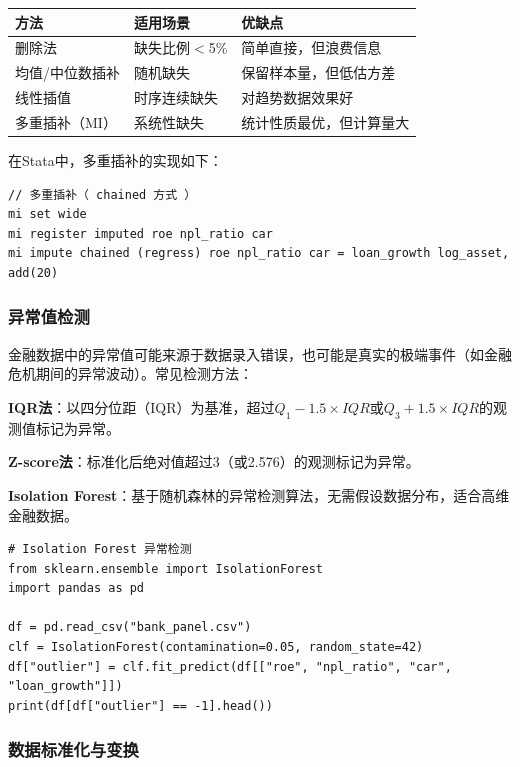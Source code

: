 \begin{table}[H]
\centering
\begin{tabular}{lp{4cm}p{5cm}}
\toprule
\textbf{方法} & \textbf{适用场景} & \textbf{优缺点} \\
\midrule
删除法 & 缺失比例$<$5\% & 简单直接，但浪费信息 \\
均值/中位数插补 & 随机缺失 & 保留样本量，但低估方差 \\
线性插值 & 时序连续缺失 & 对趋势数据效果好 \\
多重插补（MI） & 系统性缺失 & 统计性质最优，但计算量大 \\
\bottomrule
\end{tabular}
\end{table}

在Stata中，多重插补的实现如下：

\begin{lstlisting}[style=stata]
// 多重插补（ chained 方式 ）
mi set wide
mi register imputed roe npl_ratio car
mi impute chained (regress) roe npl_ratio car = loan_growth log_asset, add(20)
\end{lstlisting}

\subsubsection{异常值检测}

金融数据中的异常值可能来源于数据录入错误，也可能是真实的极端事件（如金融危机期间的异常波动）。常见检测方法：

\textbf{IQR法}：以四分位距（IQR）为基准，超过$Q_1 - 1.5 \times IQR$或$Q_3 + 1.5 \times IQR$的观测值标记为异常。

\textbf{Z-score法}：标准化后绝对值超过3（或2.576）的观测标记为异常。

\textbf{Isolation Forest}：基于随机森林的异常检测算法，无需假设数据分布，适合高维金融数据。

\begin{lstlisting}[style=python]
# Isolation Forest 异常检测
from sklearn.ensemble import IsolationForest
import pandas as pd

df = pd.read_csv("bank_panel.csv")
clf = IsolationForest(contamination=0.05, random_state=42)
df["outlier"] = clf.fit_predict(df[["roe", "npl_ratio", "car", "loan_growth"]])
print(df[df["outlier"] == -1].head())
\end{lstlisting}

\subsubsection{数据标准化与变换}

